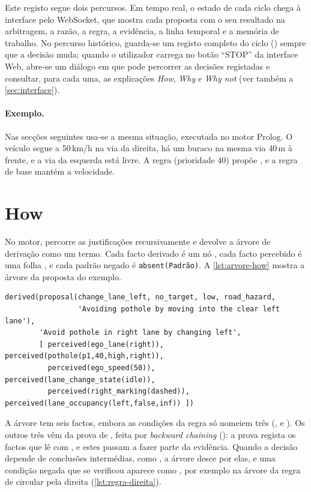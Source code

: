 Este registo segue dois percursos. Em tempo real, o estado de cada ciclo chega à
interface pelo WebSocket, que mostra cada proposta com o seu resultado na
arbitragem, a razão, a regra, a evidência, a linha temporal e a memória de
trabalho. No percurso histórico, guarda-se um registo completo do ciclo
() sempre que a decisão muda; quando o utilizador carrega
no botão \enquote{STOP} da interface Web, abre-se um diálogo em que pode
percorrer as decisões registadas e consultar, para cada uma, as explicações
\emph{How}, \emph{Why} e \emph{Why not} (ver também a \cref{sec:interface}).

\paragraph{Exemplo.} Nas secções seguintes usa-se a mesma situação, executada no
motor Prolog. O veículo segue a 50\,km/h na via da direita, há um buraco na
mesma via 40\,m à frente, e a via da esquerda está livre. A regra
 (prioridade 40) propõe
, e a regra de base mantém a velocidade.

\section{How}
\label{sec:expl-how}

No motor,  percorre as justificações 
recursivamente e devolve a árvore de derivação como um termo. Cada facto
derivado é um nó , cada facto percebido é uma
folha , e cada padrão negado é \texttt{absent(Padrão)}. A
\cref{lst:arvore-how} mostra a árvore da proposta do exemplo.

\begin{lstlisting}[caption={Árvore de derivação devolvida por \texttt{explain/2} para a proposta do exemplo},label=lst:arvore-how]
derived(proposal(change_lane_left, no_target, low, road_hazard,
                 'Avoiding pothole by moving into the clear left lane'),
        'Avoid pothole in right lane by changing left',
        [ perceived(ego_lane(right)),       perceived(pothole(p1,40,high,right)),
          perceived(ego_speed(50)),         perceived(lane_change_state(idle)),
          perceived(right_marking(dashed)), perceived(lane_occupancy(left,false,inf)) ])
\end{lstlisting}

A árvore tem seis factos, embora as condições da regra só nomeiem três
(,  e ). Os outros três vêm da prova de
, feita por \emph{backward chaining}
(): a prova regista os factos que lê com , e estes
passam a fazer parte da evidência. Quando a decisão depende de conclusões
intermédias, como , a árvore desce por elas, e uma
condição negada que se verificou aparece como , por exemplo
 na árvore da regra de circular pela direita
(\cref{lst:regra-direita}).

